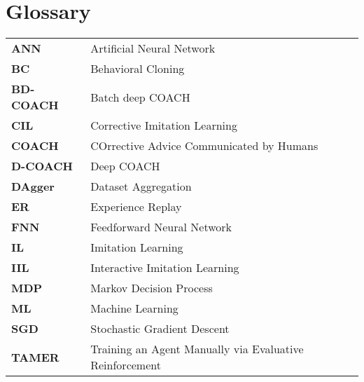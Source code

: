 \chapter{Glossary}
\label{appendix:glossary}

\begin{tabular}{ll}
  \textbf{ANN}  &  Artificial Neural Network\\
    \textbf{BC}  & Behavioral Cloning\\
    \textbf{BD-COACH}  &  Batch deep COACH\\
  \textbf{CIL}  &  Corrective Imitation Learning\\
    \textbf{COACH}  &  COrrective Advice Communicated by Humans\\
    
      \textbf{D-COACH}  &  Deep COACH\\
        \textbf{DAgger}  &  Dataset Aggregation\\
    \textbf{ER}  &  Experience Replay\\
   \textbf{FNN}  &  Feedforward Neural Network\\
  \textbf{IL}  &  Imitation Learning\\
  \textbf{IIL}  &  Interactive Imitation Learning\\
    \textbf{MDP}  &  Markov Decision Process\\
  \textbf{ML}  &  Machine Learning\\
    \textbf{SGD}  &  Stochastic Gradient Descent\\
    \textbf{TAMER}  &  Training an Agent Manually via Evaluative Reinforcement\\




\end{tabular}


